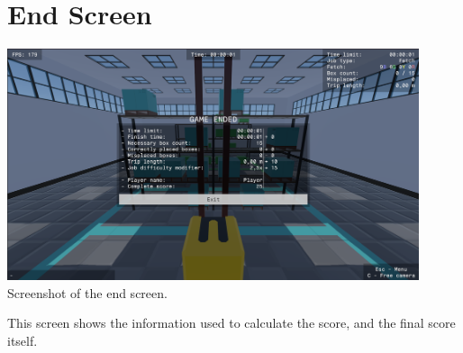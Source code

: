 \documentclass{article}
\begin{document}
\pagebreak

\section{End Screen}
\begin{center}
    \includegraphics[width=12.1cm]{end_screen}\linebreak
    \small Screenshot of the end screen.
\end{center}

\normalsize
This screen shows the information used to calculate the score, and the final score itself.

\pagebreak
\end{document}
